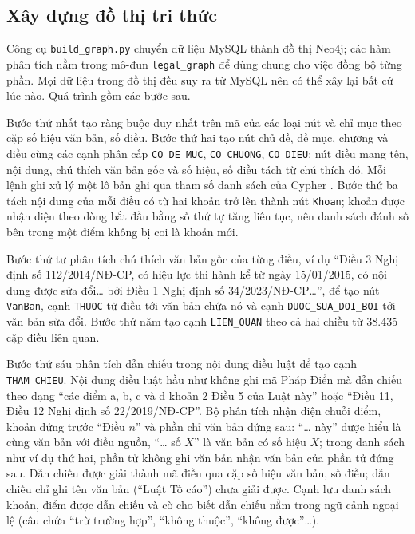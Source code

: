 \documentclass[../DoAn.tex]{subfiles}
\begin{document}
\subsection{Xây dựng đồ thị tri thức}
\label{subsection:4.data.graph}
Công cụ \texttt{build\_graph.py} chuyển dữ liệu MySQL thành đồ thị Neo4j; các hàm phân tích nằm trong mô-đun \texttt{legal\_graph} để dùng chung cho việc đồng bộ từng phần. Mọi dữ liệu trong đồ thị đều suy ra từ MySQL nên có thể xây lại bất cứ lúc nào. Quá trình gồm các bước sau.

Bước thứ nhất tạo ràng buộc duy nhất trên mã của các loại nút và chỉ mục theo cặp số hiệu văn bản, số điều. Bước thứ hai tạo nút chủ đề, đề mục, chương và điều cùng các cạnh phân cấp \texttt{CO\_DE\_MUC}, \texttt{CO\_CHUONG}, \texttt{CO\_DIEU}; nút điều mang tên, nội dung, chú thích văn bản gốc và số hiệu, số điều tách từ chú thích đó. Mỗi lệnh ghi xử lý một lô bản ghi qua tham số danh sách của Cypher \cite{neo4jdocs}. Bước thứ ba tách nội dung của mỗi điều có từ hai khoản trở lên thành nút \texttt{Khoan}; khoản được nhận diện theo dòng bắt đầu bằng số thứ tự tăng liên tục, nên danh sách đánh số bên trong một điểm không bị coi là khoản mới.

Bước thứ tư phân tích chú thích văn bản gốc của từng điều, ví dụ ``Điều 3 Nghị định số 112/2014/NĐ-CP, có hiệu lực thi hành kể từ ngày 15/01/2015, có nội dung được sửa đổi\ldots{} bởi Điều 1 Nghị định số 34/2023/NĐ-CP\ldots'', để tạo nút \texttt{VanBan}, cạnh \texttt{THUOC} từ điều tới văn bản chứa nó và cạnh \texttt{DUOC\_SUA\_DOI\_BOI} tới văn bản sửa đổi. Bước thứ năm tạo cạnh \texttt{LIEN\_QUAN} theo cả hai chiều từ 38.435 cặp điều liên quan.

Bước thứ sáu phân tích dẫn chiếu trong nội dung điều luật để tạo cạnh \texttt{THAM\_CHIEU}. Nội dung điều luật hầu như không ghi mã Pháp Điển mà dẫn chiếu theo dạng ``các điểm a, b, c và d khoản 2 Điều 5 của Luật này'' hoặc ``Điều 11, Điều 12 Nghị định số 22/2019/NĐ-CP''. Bộ phân tích nhận diện chuỗi điểm, khoản đứng trước ``Điều $n$'' và phần chỉ văn bản đứng sau: ``\ldots{} này'' được hiểu là cùng văn bản với điều nguồn, ``\ldots{} số $X$'' là văn bản có số hiệu $X$; trong danh sách như ví dụ thứ hai, phần tử không ghi văn bản nhận văn bản của phần tử đứng sau. Dẫn chiếu được giải thành mã điều qua cặp số hiệu văn bản, số điều; dẫn chiếu chỉ ghi tên văn bản (``Luật Tố cáo'') chưa giải được. Cạnh lưu danh sách khoản, điểm được dẫn chiếu và cờ cho biết dẫn chiếu nằm trong ngữ cảnh ngoại lệ (câu chứa ``trừ trường hợp'', ``không thuộc'', ``không được''\ldots).
\end{document}
